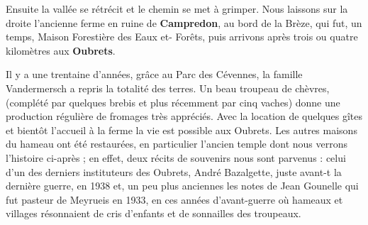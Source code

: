 Ensuite la vallée se rétrécit et le chemin se met à grimper. Nous laissons sur la droite
l’ancienne ferme en ruine de \textbf{Campredon}, au bord de la Brèze, qui fut, un temps, Maison
Forestière des Eaux et- Forêts, puis arrivons après trois ou quatre kilomètres aux \textbf{Oubrets}.

Il y a une trentaine d’années, grâce au Parc des Cévennes, la famille Vandermersch a repris la
totalité des terres. Un beau troupeau de chèvres, (complété par quelques brebis et plus
récemment par cinq vaches) donne une production régulière de fromages très appréciés.
Avec la location de quelques gîtes et bientôt l’accueil à la ferme la vie est possible aux
Oubrets. Les autres maisons du hameau ont été restaurées, en particulier l’ancien temple dont
nous verrons l’histoire ci-après ; en effet, deux récits de souvenirs nous sont parvenus : celui
d’un des derniers instituteurs des Oubrets, André Bazalgette, juste avant-t la dernière guerre,
en 1938 et, un peu plus anciennes les notes de Jean Gounelle qui fut pasteur de Meyrueis en
1933, en ces années d’avant-guerre où hameaux et villages résonnaient de cris d’enfants et de
sonnailles des troupeaux.
